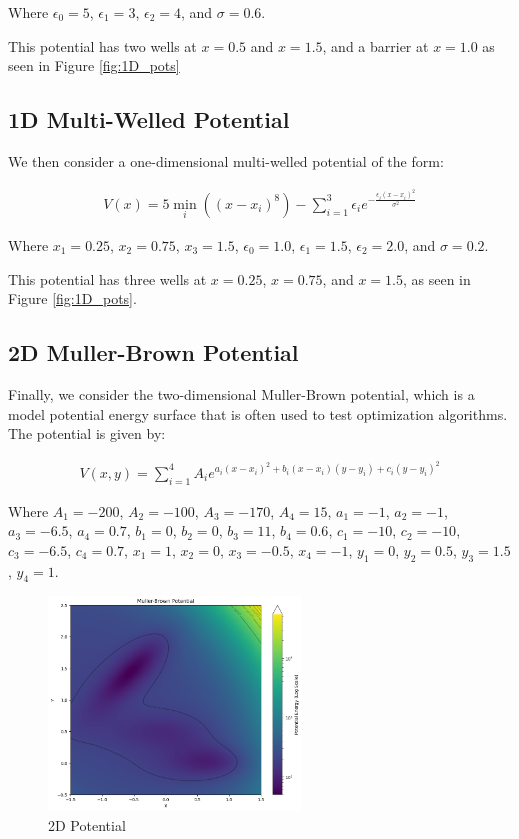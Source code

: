\documentclass{article}
\begin{document}
Where $\epsilon_0 = 5$, $\epsilon_1 = 3$, $\epsilon_2 = 4$, and $\sigma = 0.6$.

This potential has two wells at $x = 0.5$ and $x = 1.5$, and a barrier at $x = 1.0$ as seen in Figure \ref{fig:1D_pots}

\subsection{1D Multi-Welled Potential}

We then consider a one-dimensional multi-welled potential of the form:

\begin{align*}
    V(x) = 5 \min_{i} \left((x - x_i)^8\right) - \sum_  {i=1}^{3} \epsilon_i e^{-\frac{\epsilon_i(x-x_i)^2}{\sigma^2}}
\end{align*}

Where $x_1 = 0.25$, $x_2 = 0.75$, $x_3 = 1.5$, $\epsilon_0 = 1.0$, $\epsilon_1 = 1.5$, $\epsilon_2 = 2.0$, and $\sigma = 0.2$.

This potential has three wells at $x = 0.25$, $x = 0.75$, and $x = 1.5$, as seen in Figure \ref{fig:1D_pots}.

\subsection{2D Muller-Brown Potential}

Finally, we consider the two-dimensional Muller-Brown potential, which is a model potential energy surface that is often used to test optimization algorithms. The potential is given by:

\begin{align*}
    V(x, y) = \sum_{i=1}^{4} A_i e^{a_i(x - x_i)^2 + b_i(x - x_i)(y - y_i) + c_i(y - y_i)^2}
\end{align*}

Where $A_1 = -200$, $A_2 = -100$, $A_3 = -170$, $A_4 = 15$, $a_1 = -1$, $a_2 = -1$, $a_3 = -6.5$, $a_4 = 0.7$, $b_1 = 0$, $b_2 = 0$, $b_3 = 11$, $b_4 = 0.6$, $c_1 = -10$, $c_2 = -10$, $c_3 = -6.5$, $c_4 = 0.7$, $x_1 = 1$, $x_2 = 0$, $x_3 = -0.5$, $x_4 = -1$, $y_1 = 0$, $y_2 = 0.5$, $y_3 = 1.5$, $y_4 = 1$.

\begin{figure}%
    \centering
    \includegraphics[width=0.6\textwidth]{images/muller_brown_V.png}
    \caption{2D Potential}%
    \label{fig:2D_pot}%
\end{figure}
\end{document}
